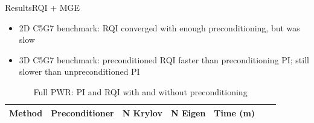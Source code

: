 \documentclass[final]{beamer}
\begin{document}
\begin{frame}{}
\begin{columns}[t]
\begin{column}{.3\linewidth}
   \begin{block}{Results\textemdash RQI + MGE}
	 \begin{itemize}
	 \item{2D C5G7 benchmark: RQI converged with enough preconditioning, but was slow}
	 \item{3D C5G7 benchmark: preconditioned RQI faster than preconditioning PI; 
	  still slower than unpreconditioned PI}
	 \end{itemize}
\vspace*{-0.3 em}
	 \begin{table}[h!]
  \caption{Full PWR: PI and RQI with and without preconditioning}
    \begin{tabular}{ c  c  c  c  c  c  c }
      \hline
      Method & Preconditioner & N Krylov & N Eigen & Time (m) \\
      \hline

\end{tabular}
\end{table}
\end{block}
\end{column}
\end{columns}
\end{frame}
\end{document}
